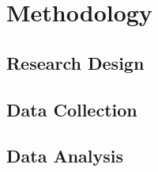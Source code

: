 \chapter{Methodology}
\label{ch:03_methods}

\section{Research Design}
\label{sec:03_methods-design}

\blindtext

\section{Data Collection}
\label{sec:03_methods-collection}

\blindtext

\section{Data Analysis}
\label{sec:03_methods-analysis}

\blindtext